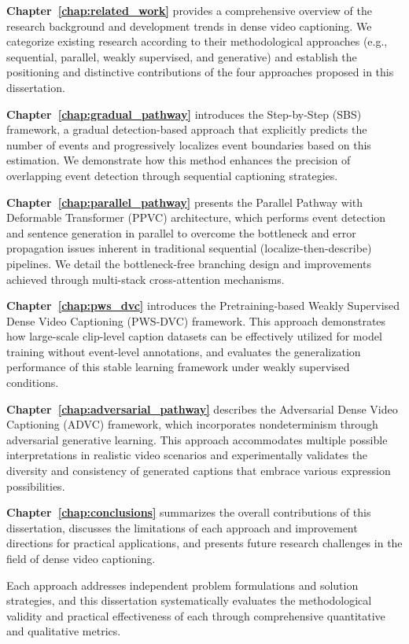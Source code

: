 \textbf{Chapter~\ref{chap:related_work}} provides a comprehensive overview of the research background and development trends in dense video captioning. We categorize existing research according to their methodological approaches (e.g., sequential, parallel, weakly supervised, and generative) and establish the positioning and distinctive contributions of the four approaches proposed in this dissertation.

\textbf{Chapter~\ref{chap:gradual_pathway}} introduces the Step-by-Step (SBS) framework, a gradual detection-based approach that explicitly predicts the number of events and progressively localizes event boundaries based on this estimation. We demonstrate how this method enhances the precision of overlapping event detection through sequential captioning strategies.

\textbf{Chapter~\ref{chap:parallel_pathway}} presents the Parallel Pathway with Deformable Transformer (PPVC) architecture, which performs event detection and sentence generation in parallel to overcome the bottleneck and error propagation issues inherent in traditional sequential (localize-then-describe) pipelines.
We detail the bottleneck-free branching design and improvements achieved through multi-stack cross-attention mechanisms.

\textbf{Chapter~\ref{chap:pws_dvc}} introduces the Pretraining-based Weakly Supervised Dense Video Captioning (PWS-DVC) framework.
This approach demonstrates how large-scale clip-level caption datasets can be effectively utilized for model training without event-level annotations, and evaluates the generalization performance of this stable learning framework under weakly supervised conditions.

\textbf{Chapter~\ref{chap:adversarial_pathway}} describes the Adversarial Dense Video Captioning (ADVC) framework, which incorporates nondeterminism through adversarial generative learning.
This approach accommodates multiple possible interpretations in realistic video scenarios and experimentally validates the diversity and consistency of generated captions that embrace various expression possibilities.

\textbf{Chapter~\ref{chap:conclusions}} summarizes the overall contributions of this dissertation, discusses the limitations of each approach and improvement directions for practical applications, and presents future research challenges in the field of dense video captioning.

Each approach addresses independent problem formulations and solution strategies, and this dissertation systematically evaluates the methodological validity and practical effectiveness of each through comprehensive quantitative and qualitative metrics.